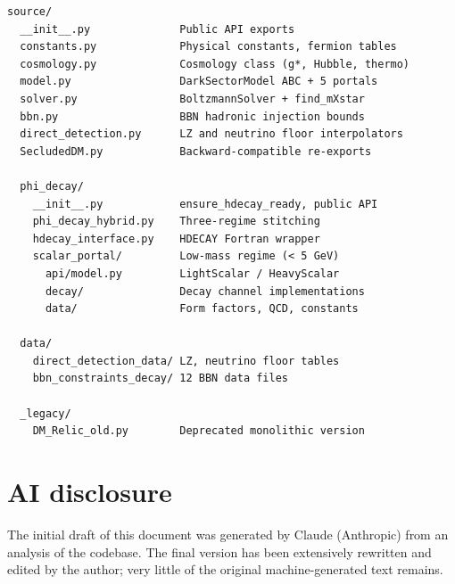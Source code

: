 \documentclass[11pt]{article}
\numberwithin{equation}{section}
\begin{document}
\begin{verbatim}
source/
  __init__.py              Public API exports
  constants.py             Physical constants, fermion tables
  cosmology.py             Cosmology class (g*, Hubble, thermo)
  model.py                 DarkSectorModel ABC + 5 portals
  solver.py                BoltzmannSolver + find_mXstar
  bbn.py                   BBN hadronic injection bounds
  direct_detection.py      LZ and neutrino floor interpolators
  SecludedDM.py            Backward-compatible re-exports

  phi_decay/
    __init__.py            ensure_hdecay_ready, public API
    phi_decay_hybrid.py    Three-regime stitching
    hdecay_interface.py    HDECAY Fortran wrapper
    scalar_portal/         Low-mass regime (< 5 GeV)
      api/model.py         LightScalar / HeavyScalar
      decay/               Decay channel implementations
      data/                Form factors, QCD, constants

  data/
    direct_detection_data/ LZ, neutrino floor tables
    bbn_constraints_decay/ 12 BBN data files

  _legacy/
    DM_Relic_old.py        Deprecated monolithic version
\end{verbatim}


\section*{AI disclosure}
The initial draft of this document was generated by Claude (Anthropic) from an analysis of the codebase. The final version has been extensively rewritten and edited by the author; very little of the original machine-generated text remains.
\clearpage
{}
{}


\end{document}
